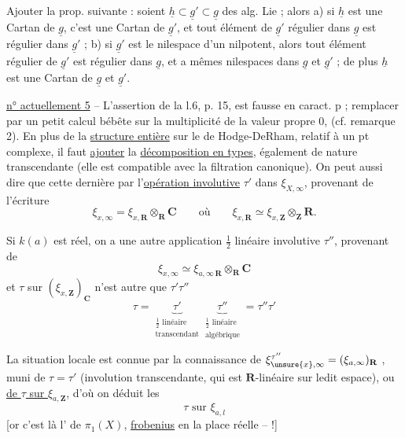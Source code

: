 Ajouter la prop. suivante : soient $\underline{h}\subset\underline{g}'\subset\underline{g}$ des alg. Lie ; alors a) si $\underline{h}$ est une Cartan de $\underline{g}$, c'est une Cartan de $\underline{g}'$, et tout élément de $\underline{g}'$ régulier dans $\underline{g}$ est régulier dans $\underline{g}'$ ; b) si $\underline{g}'$ est le nilespace d'un nilpotent, alors tout élément régulier de $\underline{g}'$ est régulier dans $\underline{g}$, et a mêmes nilespaces dans $\underline{g}$ et $\underline{g}'$ ; de plus $\underline{h}$ est une Cartan de $\underline{g}$ et $\underline{g}'$.

\uline{n° actuellement 5} -- L'assertion de la l.6, p. 15, est fausse en caract. p ; remplacer par un petit calcul bébête sur la multiplicité de la valeur propre 0, (cf. remarque 2).
En plus de la \uline{structure entière} sur le  de Hodge-DeRham, relatif à un pt complexe, il faut \uline{ajouter} la \uline{décomposition en types}, également de nature transcendante (elle est compatible avec la filtration canonique). On peut aussi dire que cette dernière   par l'\uline{opération involutive} $\tau'$  dans $\xi_{X,\infty}$, provenant de l'écriture
\[
\xi_{x,\infty}=\xi_{x,\mathbf R}\otimes_{\mathbf R}\mathbf C
\qquad\text{où}\qquad
\xi_{x,\mathbf R}\simeq\xi_{x,\mathbf Z}\otimes_{\mathbf Z}\mathbf R.
\]

Si $k(a)$ est réel, on a une autre application $\frac12$ linéaire involutive $\tau''$, provenant de
\[
\xi_{x,\infty}\simeq\xi_{a,\infty\,\mathbf R}\otimes_{\mathbf R}\mathbf C
\]
et $\tau$ sur $(\xi_{x,\mathbf Z})_{\mathbf C}$ n'est autre que $\tau'\tau''$
\[
\tau=\underbrace{\tau'}_{\substack{\frac12\text{ linéaire}\\\text{transcendant}}}\underbrace{\tau''}_{\substack{\frac12\text{ linéaire}\\\text{algébrique}}}=\tau''\tau'
\]

La situation locale  est connue par la connaissance de $\xi_{\unsure{x},\infty}^{\tau''}=(\xi_{a,\infty})_{\mathbf R}$ , muni de $\tau=\tau'$ (involution transcendante, qui est $\mathbf R$-linéaire sur ledit espace), ou  \uline{ de $\tau$ sur $\xi_{a,\mathbf Z}$}, d'où on déduit les
\[
\boxed{\tau\text{ sur }\xi_{a,l}}
\]
[or c'est là  l' de $\pi_1(X)$, \uline{frobenius} en la place réelle -- !]

